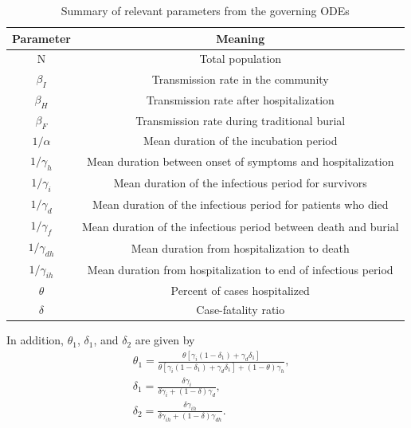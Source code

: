 \documentclass[11pt,letter]{article}
\begin{document}
\begin{table}
\caption{Summary of relevant parameters from the governing ODEs}
\begin{center}
\begin{tabular}{|c|c|}
\hline
\textbf{Parameter}&\textbf{Meaning}\\
\hline
N&Total population\\
\hline
$\beta_I$&Transmission rate in the community\\
\hline
$\beta_H$&Transmission rate after hospitalization\\
\hline
$\beta_F$&Transmission rate during traditional burial\\
\hline
$1/\alpha$&Mean duration of the incubation period\\
\hline
$1/\gamma_h$&Mean duration between onset of symptoms and hospitalization\\
\hline
$1/\gamma_i$&Mean duration of the infectious period for survivors\\
\hline
$1/\gamma_d$&Mean duration of the infectious period for patients who died\\
\hline
$1/\gamma_f$&Mean duration of the infectious period between death and burial\\
\hline
$1/\gamma_{dh}$&Mean duration from hospitalization to death\\
\hline
$1/\gamma_{ih}$&Mean duration from hospitalization to end of infectious period\\
\hline
$\theta$&Percent of cases hospitalized\\
\hline
$\delta$&Case-fatality ratio\\
\hline
\end{tabular}
\end{center}
\end{table}

In addition, $\theta_1$, $\delta_1$, and $\delta_2$ are given by
\begin{subequations}
	\begin{align}
		&\theta_1=\frac{\theta[\gamma_i(1-\delta_1)+\gamma_d\delta_1]}{\theta[\gamma_i(1-\delta_1)+\gamma_d\delta_1]+(1-\theta)\gamma_h},\\
		&\delta_1=\frac{\delta\gamma_i}{\delta\gamma_i+(1-\delta)\gamma_d},\\
		&\delta_2=\frac{\delta\gamma_{ih}}{\delta\gamma_{ih}+(1-\delta)\gamma_{dh}}.
	\end{align}
\end{subequations}
\end{document}
